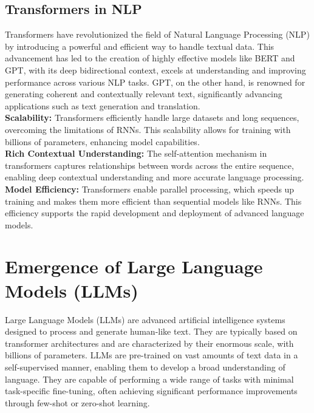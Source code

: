 \subsection{Transformers in NLP}
Transformers have revolutionized the field of Natural Language Processing (NLP) by introducing a powerful and efficient way to handle textual data. This advancement has led to the creation of highly effective models like BERT and GPT, with its deep bidirectional context, excels at understanding and improving performance across various NLP tasks. GPT, on the other hand, is renowned for generating coherent and contextually relevant text, significantly advancing applications such as text generation and translation\cite{devlin2019bert}.\\
\textbf{Scalability:} Transformers efficiently handle large datasets and long sequences, overcoming the limitations of RNNs. This scalability allows for training with billions of parameters, enhancing model capabilities.\\
\textbf{Rich Contextual Understanding: }The self-attention mechanism in transformers captures relationships between words across the entire sequence, enabling deep contextual understanding and more accurate language processing.\\
\textbf{Model Efficiency:} Transformers enable parallel processing, which speeds up training and makes them more efficient than sequential models like RNNs. This efficiency supports the rapid development and deployment of advanced language models\cite{vaswani2017attention}.
\section{ Emergence of Large Language Models (LLMs)}

Large Language Models (LLMs) are advanced artificial intelligence systems designed to process and generate human-like text. They are typically based on transformer architectures and are characterized by their enormous scale, with billions of parameters. LLMs are pre-trained on vast amounts of text data in a self-supervised manner, enabling them to develop a broad understanding of language. They are capable of performing a wide range of tasks with minimal task-specific fine-tuning, often achieving significant performance improvements through few-shot or zero-shot learning\cite{brown2020language}.
